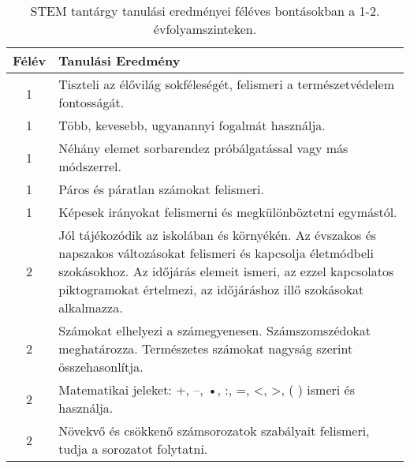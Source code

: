        
           \begin{longtable}{c | p{12cm} }
            \caption[STEM 1-2.]{STEM tantárgy tanulási eredményei féléves bontásokban a 1-2. évfolyamszinteken. }  \\

            \textbf{Félév} & \textbf{Tanulási Eredmény} \\
            \hline
            \endhead
                                
                                      
                                
                                          1 &  Tiszteli az élővilág sokféleségét, felismeri a természetvédelem fontosságát. \\ \hline
                                          1 &  Több, kevesebb, ugyanannyi fogalmát használja. \\ \hline
                                          1 &  Néhány elemet sorbarendez próbálgatással vagy más módszerrel. \\ \hline
                                          1 &  Páros és páratlan számokat felismeri. \\ \hline
                                          1 &  Képesek irányokat felismerni és megkülönböztetni egymástól. \\ \hline
                                      
                                
                                          2 &  Jól tájékozódik az iskolában és környékén. Az évszakos és napszakos változásokat felismeri és kapcsolja életmódbeli szokásokhoz. Az időjárás elemeit ismeri, az ezzel kapcsolatos piktogramokat értelmezi, az időjáráshoz illő szokásokat alkalmazza. \\ \hline
                                          2 &  Számokat elhelyezi a számegyenesen. Számszomszédokat meghatározza. Természetes számokat nagyság szerint összehasonlítja. \\ \hline
                                          2 &  Matematikai jeleket: +, –, •, :, =, <, >, ( ) ismeri és használja. \\ \hline
                                          2 &  Növekvő és csökkenő számsorozatok szabályait felismeri, tudja a sorozatot folytatni. \\ \hline
                                      

\end{longtable}
